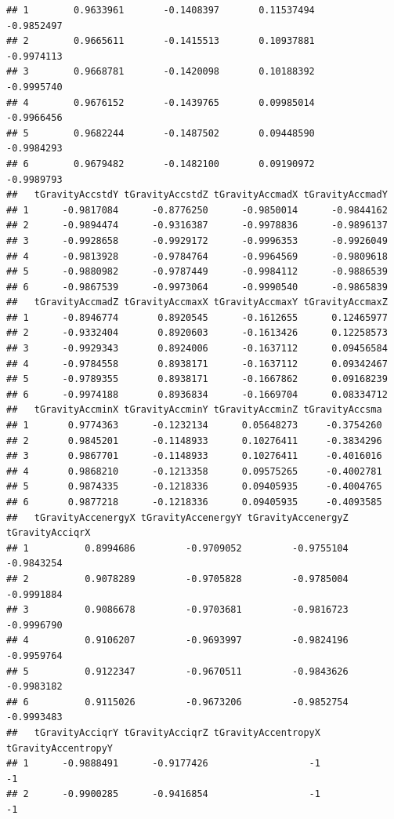 \documentclass[
]{article}
\begin{document}
\begin{verbatim}
## 1        0.9633961       -0.1408397       0.11537494      -0.9852497
## 2        0.9665611       -0.1415513       0.10937881      -0.9974113
## 3        0.9668781       -0.1420098       0.10188392      -0.9995740
## 4        0.9676152       -0.1439765       0.09985014      -0.9966456
## 5        0.9682244       -0.1487502       0.09448590      -0.9984293
## 6        0.9679482       -0.1482100       0.09190972      -0.9989793
##   tGravityAccstdY tGravityAccstdZ tGravityAccmadX tGravityAccmadY
## 1      -0.9817084      -0.8776250      -0.9850014      -0.9844162
## 2      -0.9894474      -0.9316387      -0.9978836      -0.9896137
## 3      -0.9928658      -0.9929172      -0.9996353      -0.9926049
## 4      -0.9813928      -0.9784764      -0.9964569      -0.9809618
## 5      -0.9880982      -0.9787449      -0.9984112      -0.9886539
## 6      -0.9867539      -0.9973064      -0.9990540      -0.9865839
##   tGravityAccmadZ tGravityAccmaxX tGravityAccmaxY tGravityAccmaxZ
## 1      -0.8946774       0.8920545      -0.1612655      0.12465977
## 2      -0.9332404       0.8920603      -0.1613426      0.12258573
## 3      -0.9929343       0.8924006      -0.1637112      0.09456584
## 4      -0.9784558       0.8938171      -0.1637112      0.09342467
## 5      -0.9789355       0.8938171      -0.1667862      0.09168239
## 6      -0.9974188       0.8936834      -0.1669704      0.08334712
##   tGravityAccminX tGravityAccminY tGravityAccminZ tGravityAccsma
## 1       0.9774363      -0.1232134      0.05648273     -0.3754260
## 2       0.9845201      -0.1148933      0.10276411     -0.3834296
## 3       0.9867701      -0.1148933      0.10276411     -0.4016016
## 4       0.9868210      -0.1213358      0.09575265     -0.4002781
## 5       0.9874335      -0.1218336      0.09405935     -0.4004765
## 6       0.9877218      -0.1218336      0.09405935     -0.4093585
##   tGravityAccenergyX tGravityAccenergyY tGravityAccenergyZ tGravityAcciqrX
## 1          0.8994686         -0.9709052         -0.9755104      -0.9843254
## 2          0.9078289         -0.9705828         -0.9785004      -0.9991884
## 3          0.9086678         -0.9703681         -0.9816723      -0.9996790
## 4          0.9106207         -0.9693997         -0.9824196      -0.9959764
## 5          0.9122347         -0.9670511         -0.9843626      -0.9983182
## 6          0.9115026         -0.9673206         -0.9852754      -0.9993483
##   tGravityAcciqrY tGravityAcciqrZ tGravityAccentropyX tGravityAccentropyY
## 1      -0.9888491      -0.9177426                  -1                  -1
## 2      -0.9900285      -0.9416854                  -1                  -1

\end{verbatim}
\end{document}
